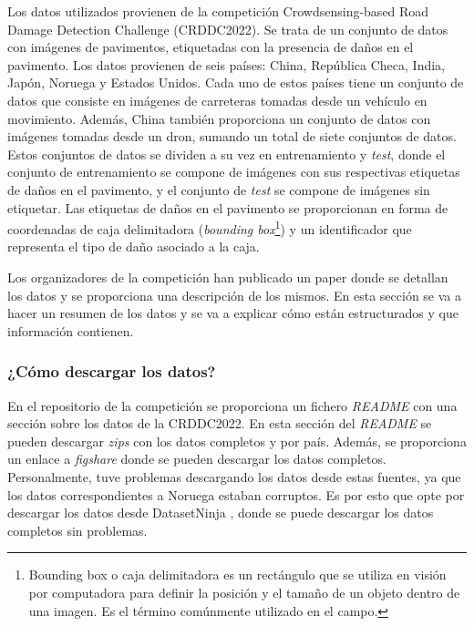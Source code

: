 Los datos utilizados provienen de la competición Crowdsensing-based Road Damage Detection Challenge (CRDDC2022)\cite{CRDDC2022_paper}. Se trata de un conjunto de datos con imágenes de pavimentos, etiquetadas con la presencia de daños en el pavimento. Los datos provienen de seis países: China, República Checa, India, Japón, Noruega y Estados Unidos. Cada uno de estos países tiene un conjunto de datos que consiste en imágenes de carreteras tomadas desde un vehículo en movimiento. Además, China también proporciona un conjunto de datos con imágenes tomadas desde un dron, sumando un total de siete conjuntos de datos. Estos conjuntos de datos se dividen a su vez en entrenamiento y \textit{test}, donde el conjunto de entrenamiento se compone de imágenes con sus respectivas etiquetas de daños en el pavimento, y el conjunto de \textit{test} se compone de imágenes sin etiquetar. Las etiquetas de daños en el pavimento se proporcionan en forma de coordenadas de caja delimitadora (\textit{bounding box}\footnote{Bounding box o caja delimitadora es un rectángulo que se utiliza en visión por computadora para definir la posición y el tamaño de un objeto dentro de una imagen. Es el término comúnmente utilizado en el campo.}) y un identificador que representa el tipo de daño asociado a la caja.

Los organizadores de la competición han publicado un paper \cite{RDD2022_data_paper} donde se detallan los datos y se proporciona una descripción de los mismos. En esta sección se va a hacer un resumen de los datos y se va a explicar cómo están estructurados y que información contienen.


\subsubsection{¿Cómo descargar los datos?}
En el repositorio de la competición \cite{RoadDamageDetector_repo} se proporciona un fichero \textit{README} con una sección sobre los datos de la CRDDC2022. En esta sección del \textit{README} se pueden descargar \textit{zips} con los datos completos y por país. Además, se proporciona un enlace a \textit{figshare} \cite{RDD2022_dataset} donde se pueden descargar los datos completos. Personalmente, tuve problemas descargando los datos desde estas fuentes, ya que los datos correspondientes a Noruega estaban corruptos. Es por esto que opte por descargar los datos desde DatasetNinja \cite{RDD2022_datasetNinja}, donde se puede descargar los datos completos sin problemas.


